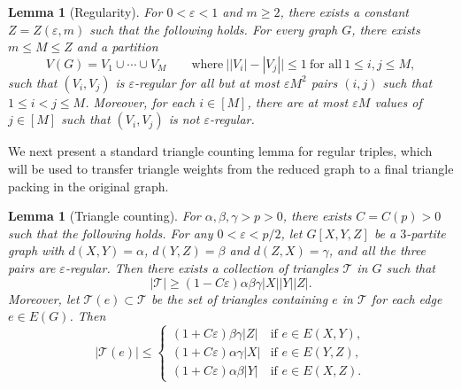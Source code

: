 \documentclass[11pt,reqno]{amsart}
\newtheorem{lemma}[theorem]{Lemma}
\theoremstyle{definition}
\theoremstyle{remark}
\newcommand\dT{\mathcal{T}}
\renewcommand\leq{\leqslant}
\renewcommand\le{\leqslant}
\renewcommand\ge{\geqslant}
\begin{document}
\begin{lemma}[Regularity]\label{lem:regularity}
For $0<\varepsilon<1$ and $m\ge 2$, there exists a constant $Z=Z(\varepsilon,m)$ such that the following holds. For every graph $G$, there exists $m\le M\le Z$ and a partition
$$V(G)=V_1\cup \cdots \cup V_{M} \qquad\text{where}\ \big||V_i|-|V_j|\big|\leq 1\ \text{for all}\ 1\leq i,j\leq M,$$
such that $(V_i,V_j)$ is $\varepsilon$-regular for all but at most $\varepsilon M^2$ pairs $(i,j)$ such that $1\le i<j\le M$. Moreover, for each $i\in [M]$, there are at most $\varepsilon M$ values of $j\in [M]$ such that $(V_i,V_j)$ is not $\varepsilon$-regular.
\end{lemma}

We next present a standard triangle counting lemma for regular triples, which will be used to transfer triangle weights from the reduced graph to a final triangle packing in the original graph.


\begin{lemma}[Triangle counting]\label{lem:trianglecounting}
For $\alpha,\beta,\gamma>p>0$, there exists $C=C(p)>0$ such that the following holds. For any $0<\varepsilon<p/2$, let $G[X,Y,Z]$ be a $3$-partite graph with $d(X,Y)=\alpha$, $d(Y,Z)=\beta$ and $d(Z,X)=\gamma$, and all the three pairs are $\varepsilon$-regular. Then there exists a collection of triangles $\mathcal T$ in $G$ such that
\[
|\mathcal T|
\ge
(1-C\varepsilon)\alpha\beta\gamma |X||Y||Z|.
\]
Moreover, let $\dT(e)\subset\dT$ be the set of triangles containing $e$ in $\dT$ for each edge $e\in E(G)$. Then
\begin{equation}\label{eq:Taue}
|\dT(e)| \le
\begin{cases}
(1+C\varepsilon)\beta\gamma |Z| & \text{if } e \in E(X,Y), \\[4pt]
(1+C\varepsilon)\alpha\gamma |X| & \text{if } e \in E(Y,Z), \\[4pt]
(1+C\varepsilon)\alpha\beta |Y| & \text{if } e \in E(X,Z).
\end{cases}
\end{equation}
\end{lemma}
\end{document}
